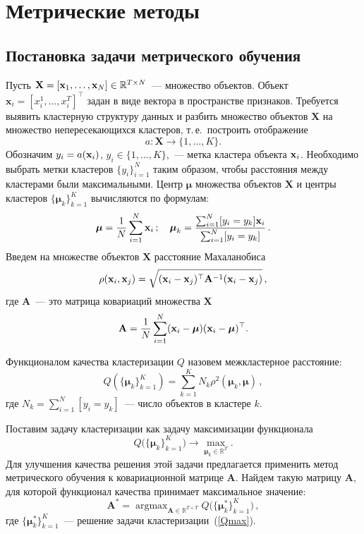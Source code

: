 \chapter{Метрические методы}

\section{Постановка задачи метрического обучения}
Пусть $\mathbf{X} = [\mathbf{x}_1, \ldots, \mathbf{x}_N] \in \mathbb{R}^{T \times N}$~--- множество объектов.
Объект $\mathbf{x}_i = [x_i^1, \ldots, x_i^T]^\top$ задан в виде вектора в пространстве признаков.
Требуется выявить кластерную структуру данных и разбить множество объектов $\mathbf{X}$ на множество непересекающихся кластеров,
т.\,е.\ построить отображение
\[
a: \mathbf{X} \to \{1, \dots, K\}.
\]
Обозначим $y_i = a (\mathbf{x}_i)$, $y_i \in \{1, \ldots, K\}$,~--- метка кластера объекта $\mathbf{x}_i$.
Необходимо выбрать метки кластеров $\{y_i\}_{i=1}^N$ таким образом, чтобы расстояния между кластерами были максимальными.
Центр $\boldsymbol{\mu}$ множества объектов $\mathbf{X}$ и центры кластеров $\{\boldsymbol{\mu}_k\}_{k=1}^K$ вычисляются по формулам:
\begin{equation}
\label{mu}
\boldsymbol{\mu} =\frac1N \sum_{i=1}^N\mathbf{x}_i\,; \quad
\boldsymbol{\mu}_k =\frac{ \sum_{i=1}^N [y_i = y_k]\mathbf{x}_i } {\sum_{i=1}^N [y_i = y_k]}\,.
\end{equation}
Введем на множестве объектов $\mathbf{X}$ расстояние Махаланобиса
\begin{equation}
\label{metric}
\rho (\mathbf{x}_i, \mathbf{x}_j) = \sqrt{(\mathbf{x}_i - \mathbf{x}_j)^{\top} \mathbf{A}^{-1} (\mathbf{x}_i - \mathbf{x}_j)}\,,
\end{equation}
где $\mathbf{A}$~--- это матрица ковариаций множества $\mathbf{X}$
\begin{equation}
\label{covMatrix}
\mathbf{A} = \frac 1N \sum_{i=1}^N(\mathbf{x}_i - \boldsymbol{\mu})(\mathbf{x}_i - \boldsymbol{\mu})^{\top}.
\end{equation}
\begin{definition}
	Функционалом качества кластеризации $Q$ назовем межкластерное расстояние:
	\[
	Q (\{\boldsymbol{\mu}_k\}_{k=1}^K)= \sum_{k=1}^K N_k \rho^2(\boldsymbol{\mu}_k, \boldsymbol{\mu})\,,
	\]
	где $N_k = \sum_{i=1}^N [y_i = y_k]$~--- число объектов в кластере $k$.
\end{definition}

Поставим задачу кластеризации как задачу максимизации функционала
\begin{equation}
\label{Qmax}
Q \bigl(\{\boldsymbol{\mu}_k\}_{k=1}^K\bigr) \to \max_{\boldsymbol{\mu}_k \in \mathbb{R}^T}.
\end{equation}
Для улучшения качества решения этой задачи предлагается применить метод метрического обучения к ковариационной матрице $\mathbf{A}$.
Найдем такую матрицу $\mathbf{A}$, для которой функционал качества принимает максимальное значение:
\begin{equation}
\label{Amax}
\mathbf{A}^* = \mathop{\arg \max}_{\mathbf{A} \in \mathbb{R}^{T \times T}} Q \bigl(\{\boldsymbol{\mu}_k^*\}_{k=1}^K \bigr)\,,
\end{equation}
где $\{\boldsymbol{\mu}_k^*\}_{k=1}^K$~--- решение задачи кластеризации~(\ref{Qmax}).

